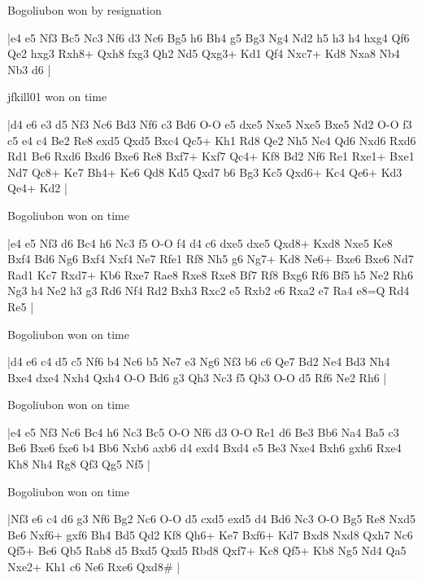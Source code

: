 Bogoliubon won by resignation

\makegametitle
|e4 e5 Nf3 Bc5 Nc3 Nf6 d3 Nc6 Bg5 h6 Bh4 g5 Bg3 Ng4 Nd2 h5 h3 h4 hxg4 Qf6 Qe2 hxg3 Rxh8+ Qxh8 fxg3 Qh2 Nd5 Qxg3+ Kd1 Qf4 Nxc7+ Kd8 Nxa8 Nb4 Nb3 d6  |

\showboard

jfkill01 won on time

\makegametitle
|d4 e6 e3 d5 Nf3 Nc6 Bd3 Nf6 c3 Bd6 O-O e5 dxe5 Nxe5 Nxe5 Bxe5 Nd2 O-O f3 c5 e4 c4 Be2 Re8 exd5 Qxd5 Bxc4 Qc5+ Kh1 Rd8 Qe2 Nh5 Ne4 Qd6 Nxd6 Rxd6 Rd1 Be6 Rxd6 Bxd6 Bxe6 Re8 Bxf7+ Kxf7 Qc4+ Kf8 Bd2 Nf6 Re1 Rxe1+ Bxe1 Nd7 Qc8+ Ke7 Bh4+ Ke6 Qd8 Kd5 Qxd7 b6 Bg3 Kc5 Qxd6+ Kc4 Qe6+ Kd3 Qe4+ Kd2  |

\showboard

Bogoliubon won on time

\makegametitle
|e4 e5 Nf3 d6 Bc4 h6 Nc3 f5 O-O f4 d4 c6 dxe5 dxe5 Qxd8+ Kxd8 Nxe5 Ke8 Bxf4 Bd6 Ng6 Bxf4 Nxf4 Ne7 Rfe1 Rf8 Nh5 g6 Ng7+ Kd8 Ne6+ Bxe6 Bxe6 Nd7 Rad1 Kc7 Rxd7+ Kb6 Rxe7 Rae8 Rxe8 Rxe8 Bf7 Rf8 Bxg6 Rf6 Bf5 h5 Ne2 Rh6 Ng3 h4 Ne2 h3 g3 Rd6 Nf4 Rd2 Bxh3 Rxc2 e5 Rxb2 e6 Rxa2 e7 Ra4 e8=Q Rd4 Re5  |

\showboard

Bogoliubon won on time

\makegametitle
|d4 e6 c4 d5 c5 Nf6 b4 Nc6 b5 Ne7 e3 Ng6 Nf3 b6 c6 Qe7 Bd2 Ne4 Bd3 Nh4 Bxe4 dxe4 Nxh4 Qxh4 O-O Bd6 g3 Qh3 Nc3 f5 Qb3 O-O d5 Rf6 Ne2 Rh6  |

\showboard

Bogoliubon won on time

\makegametitle
|e4 e5 Nf3 Nc6 Bc4 h6 Nc3 Bc5 O-O Nf6 d3 O-O Re1 d6 Be3 Bb6 Na4 Ba5 c3 Be6 Bxe6 fxe6 b4 Bb6 Nxb6 axb6 d4 exd4 Bxd4 e5 Be3 Nxe4 Bxh6 gxh6 Rxe4 Kh8 Nh4 Rg8 Qf3 Qg5 Nf5  |

\showboard

Bogoliubon won on time

\makegametitle
|Nf3 e6 c4 d6 g3 Nf6 Bg2 Nc6 O-O d5 cxd5 exd5 d4 Bd6 Nc3 O-O Bg5 Re8 Nxd5 Be6 Nxf6+ gxf6 Bh4 Bd5 Qd2 Kf8 Qh6+ Ke7 Bxf6+ Kd7 Bxd8 Nxd8 Qxh7 Nc6 Qf5+ Be6 Qb5 Rab8 d5 Bxd5 Qxd5 Rbd8 Qxf7+ Kc8 Qf5+ Kb8 Ng5 Nd4 Qa5 Nxe2+ Kh1 c6 Ne6 Rxe6 Qxd8\#  |

